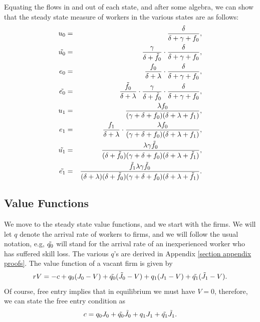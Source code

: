 \documentclass[12pt]{article} %
\theoremstyle{definition}
\begin{document}
Equating the flows in and out of each state, and after some algebra, we can show that the steady state measure of workers in the various states are as follows:  
\begin{eqnarray*}
u_0 &=& \frac{\delta}{\delta+\gamma+f_0},  \\
\tilde{u_0} &=& \frac{\gamma}{\delta+\Tilde{f_0}} \cdot  \frac{\delta}{\delta+\gamma+f_0},   \\
e_0 &=& \frac{f_0}{\delta+\lambda} \cdot \frac{\delta}{\delta+\gamma+f_0}, \\
\Tilde{e_0} &=& \frac{\Tilde{f_0}}{\delta+\lambda} \cdot \frac{\gamma}{\delta + \Tilde{f_0}} \cdot \frac{\delta}{\delta+\gamma+f_0},  \\
 u_1 &=& \frac{\lambda f_0}{(\gamma+\delta+f_0)(\delta+\lambda+f_1)},  \\
 e_1 &=& \frac{f_1}{\delta+\lambda} \cdot \frac{\lambda f_0}{(\gamma+\delta+f_0)(\delta+\lambda+f_1)}, \\
 \Tilde{u_1} &=& \frac{\lambda \gamma \Tilde{f_0}}{(\delta+\Tilde{f_0})(\gamma+\delta+f_0)(\delta+\lambda+\Tilde{f_1})}, \\
 \Tilde{e_1} &=& \frac{\Tilde{f_1}\lambda \gamma \Tilde{f_0}}{(\delta+\lambda)(\delta+\Tilde{f_0})(\gamma+\delta+f_0)(\delta+\lambda+\Tilde{f_1})}. 
\end{eqnarray*}


\subsection{Value Functions}\label{section value functions}
We move to the steady state value functions, and we start with the firms. We will let $q$ denote the arrival rate of workers to firms, and we will follow the usual notation, e.g, $\Tilde{q_0}$ will stand for the arrival rate of an inexperienced worker who has suffered skill loss. The various $q$'s are derived in Appendix \ref{section appendix proofs}. The value function of a vacant firm is given by 
\begin{equation}
   rV = -c + q_0 (J_0-V) + \Tilde{q_0}(\Tilde{J_0}-V) + q_1 (J_1-V) + \Tilde{q_1}(\Tilde{J_1}-V).\nonumber 
\end{equation}Of course, free entry implies that in equilibrium we must have $V=0$, therefore, we can state the free entry condition as 
\begin{equation}
   c= q_0 J_0 + \Tilde{q_0}\Tilde{J_0} + q_1 J_1 + \Tilde{q_1}\Tilde{J_1}.\label{eq free entry} 
\end{equation}
\end{document}
